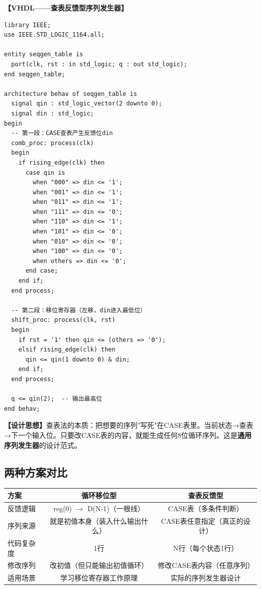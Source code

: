 \textbf{【VHDL——查表反馈型序列发生器】}
\begin{lstlisting}
library IEEE;
use IEEE.STD_LOGIC_1164.all;

entity seqgen_table is
  port(clk, rst : in std_logic; q : out std_logic);
end seqgen_table;

architecture behav of seqgen_table is
  signal qin : std_logic_vector(2 downto 0);
  signal din : std_logic;
begin
  -- 第一段：CASE查表产生反馈位din
  comb_proc: process(clk)
  begin
    if rising_edge(clk) then
      case qin is
        when "000" => din <= '1';
        when "001" => din <= '1';
        when "011" => din <= '1';
        when "111" => din <= '0';
        when "110" => din <= '1';
        when "101" => din <= '0';
        when "010" => din <= '0';
        when "100" => din <= '0';
        when others => din <= '0';
      end case;
    end if;
  end process;

  -- 第二段：移位寄存器（左移，din进入最低位）
  shift_proc: process(clk, rst)
  begin
    if rst = '1' then qin <= (others => '0');
    elsif rising_edge(clk) then
      qin <= qin(1 downto 0) & din;
    end if;
  end process;

  q <= qin(2);  -- 输出最高位
end behav;
\end{lstlisting}

\textbf{【设计思想】}查表法的本质：把想要的序列"写死"在CASE表里。当前状态→查表→下一个输入位。只要改CASE表的内容，就能生成任何8位循环序列。这是\textbf{通用序列发生器}的设计范式。

\subsection{两种方案对比}

\begin{center}
\begin{tabular}{|l|c|c|}
\hline
\textbf{方案} & \textbf{循环移位型} & \textbf{查表反馈型} \\
\hline
反馈逻辑 & reg(0) $\to$ D(N-1)（一根线） & CASE表（多条件判断） \\
序列来源 & 就是初值本身（装入什么输出什么）& CASE表任意指定（真正的设计）\\
代码复杂度 & 1行 & N行（每个状态1行）\\
修改序列 & 改初值（但只能输出初值循环）& 修改CASE表内容（任意序列）\\
适用场景 & 学习移位寄存器工作原理 & 实际的序列发生器设计 \\
\hline
\end{tabular}
\end{center}


